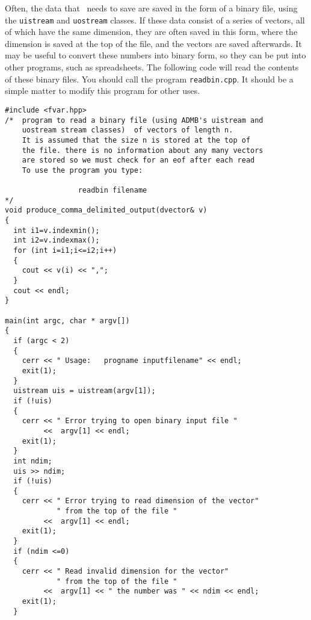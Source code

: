 \documentclass{admbmanual}
\begin{document}
Often, the data that \ADM\ needs to save are saved in the form of a binary file,
using the \texttt{uistream} and \texttt{uostream} classes. If these data consist
of a series of vectors, all of which have the same dimension, they are often
saved in this form, where the dimension is saved at the top of the file, and the
vectors are saved afterwards. It may be useful to convert these numbers into
binary form, so they can be put into other programs, such as spreadsheets. The
following code will read the contents of these binary files. You should call the
program \texttt{readbin.cpp}. It should be a simple matter to modify this
program for other uses.
\begin{lstlisting}
#include <fvar.hpp>
/*  program to read a binary file (using ADMB's uistream and
    uostream stream classes)  of vectors of length n.
    It is assumed that the size n is stored at the top of
    the file. there is no information about any many vectors
    are stored so we must check for an eof after each read
    To use the program you type:

                 readbin filename
*/
void produce_comma_delimited_output(dvector& v)
{
  int i1=v.indexmin();
  int i2=v.indexmax();
  for (int i=i1;i<=i2;i++)
  {
    cout << v(i) << ",";
  }
  cout << endl;
}

main(int argc, char * argv[])
{
  if (argc < 2)
  {
    cerr << " Usage:   progname inputfilename" << endl;
    exit(1);
  }
  uistream uis = uistream(argv[1]);
  if (!uis)
  {
    cerr << " Error trying to open binary input file "
         <<  argv[1] << endl;
    exit(1);
  }
  int ndim;
  uis >> ndim;
  if (!uis)
  {
    cerr << " Error trying to read dimension of the vector"
            " from the top of the file "
         <<  argv[1] << endl;
    exit(1);
  }
  if (ndim <=0)
  {
    cerr << " Read invalid dimension for the vector"
            " from the top of the file "
         <<  argv[1] << " the number was " << ndim << endl;
    exit(1);
  }


\end{lstlisting}
\end{document}

